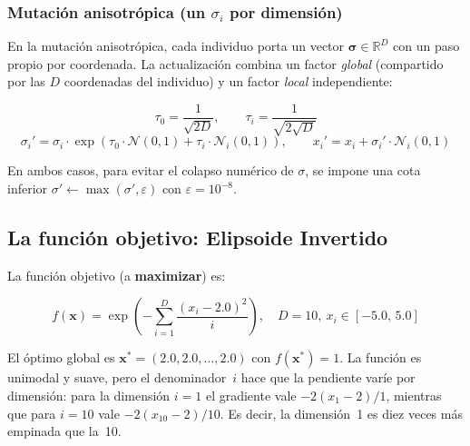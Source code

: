 \documentclass[12pt,letterpaper]{article}
\begin{document}
\subsubsection{Mutación anisotrópica (un \texorpdfstring{$\sigma_i$}{sigma\_i} por dimensión)}

En la mutación anisotrópica, cada individuo porta un vector $\boldsymbol{\sigma}\in\mathbb{R}^{D}$ con un paso propio por coordenada. La actualización combina un factor \emph{global} (compartido por las $D$ coordenadas del individuo) y un factor \emph{local} independiente:

\begin{formulabox}
\begin{equation}
    \tau_0 = \frac{1}{\sqrt{2D}}, \qquad
    \tau_i = \frac{1}{\sqrt{2\sqrt{D}}}
    \label{eq:aniso_tau}
\end{equation}
\begin{equation}
    \sigma_i' = \sigma_i\cdot\exp\!\left(\tau_0\cdot\mathcal{N}(0,1) + \tau_i\cdot\mathcal{N}_i(0,1)\right),\qquad
    x_i' = x_i + \sigma_i'\cdot\mathcal{N}_i(0,1)
    \label{eq:aniso}
\end{equation}
\end{formulabox}

En ambos casos, para evitar el colapso numérico de $\sigma$, se impone una cota inferior $\sigma'\leftarrow\max(\sigma',\varepsilon)$ con $\varepsilon=10^{-8}$.

\subsection{La función objetivo: Elipsoide Invertido}

La función objetivo (a \textbf{maximizar}) es:

\begin{formulabox}
\begin{equation}
    f(\mathbf{x}) = \exp\!\left(-\sum_{i=1}^{D}\frac{(x_i - 2.0)^2}{i}\right),\quad
    D=10,\ x_i\in[-5.0,\,5.0]
    \label{eq:objetivo}
\end{equation}
\end{formulabox}

El óptimo global es $\mathbf{x}^{*}=(2.0,2.0,\dots,2.0)$ con $f(\mathbf{x}^{*})=1$. La función es unimodal y suave, pero el denominador~$i$ hace que la pendiente varíe por dimensión: para la dimensión $i=1$ el gradiente vale $-2(x_1-2)/1$, mientras que para $i=10$ vale $-2(x_{10}-2)/10$. Es decir, la dimensión~1 es diez veces más empinada que la~10.
\end{document}

